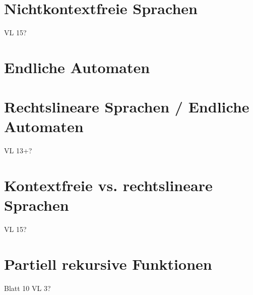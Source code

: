 \documentclass[12pt,a4paper]{article} %
\begin{document}
	\section{Nichtkontextfreie Sprachen}
	VL 15?
	
	\section{Endliche Automaten}
	
	
	\section{Rechtslineare Sprachen / Endliche Automaten}
	VL 13+?
	
	\section{Kontextfreie vs. rechtslineare Sprachen}
	VL 15?
	
	\section{Partiell rekursive Funktionen}
	Blatt 10
	VL 3?
	
\end{document}
